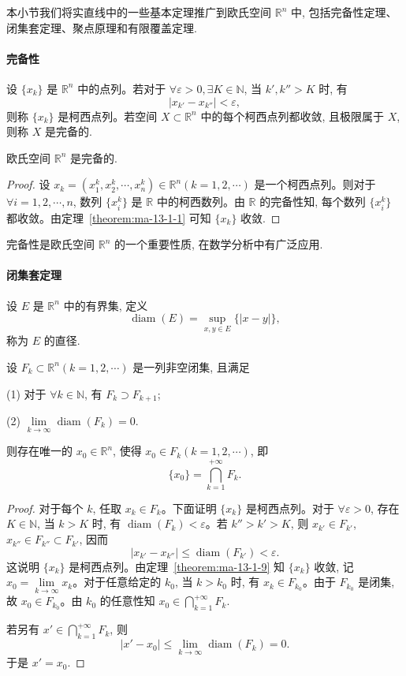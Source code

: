 本小节我们将实直线中的一些基本定理推广到欧氏空间 $\mathbb R^n$ 中, 包括完备性定理、闭集套定理、聚点原理和有限覆盖定理.

\paragraph*{完备性}


设 $\{x_k\}$ 是 $\mathbb R^n$ 中的点列。若对于 $\forall\varepsilon>0,\exists K\in\mathbb N$, 当 $k',k''>K$ 时, 有
\[
  |x_{k'}-x_{k''}|<\varepsilon,
\]
则称 $\{x_k\}$ 是柯西点列。若空间 $X\subset\mathbb R^n$ 中的每个柯西点列都收敛, 且极限属于 $X$, 则称 $X$ 是完备的.

\begin{theorem}\label{theorem:ma-13-1-9}
欧氏空间 $\mathbb R^n$ 是完备的.
\end{theorem}


\begin{proof}
设 $x_k=(x_1^k,x_2^k,\cdots,x_n^k)\in\mathbb R^n(k=1,2,\cdots)$ 是一个柯西点列。则对于 $\forall i=1,2,\cdots,n$, 数列 $\{x_i^k\}$ 是 $\mathbb R$ 中的柯西数列。由 $\mathbb R$ 的完备性知, 每个数列 $\{x_i^k\}$ 都收敛。由定理~\ref{theorem:ma-13-1-1} 可知 $\{x_k\}$ 收敛.
\end{proof}


完备性是欧氏空间 $\mathbb R^n$ 的一个重要性质, 在数学分析中有广泛应用.

\paragraph*{闭集套定理}


设 $E$ 是 $\mathbb R^n$ 中的有界集, 定义
\[
  \operatorname{diam}(E)=\sup_{x,y\in E}\{|x-y|\},
\]
称为 $E$ 的直径.

\begin{theorem}\label{theorem:ma-13-1-10}
设 $F_k\subset\mathbb R^n(k=1,2,\cdots)$ 是一列非空闭集, 且满足

(1) 对于 $\forall k\in\mathbb N$, 有 $F_k\supset F_{k+1}$;

(2) $\lim\limits_{k\to\infty}\operatorname{diam}(F_k)=0$.

则存在唯一的 $x_0\in\mathbb R^n$, 使得 $x_0\in F_k(k=1,2,\cdots)$, 即
\[
  \{x_0\}=\bigcap_{k=1}^{+\infty}F_k.
\]
\end{theorem}


\begin{proof}
对于每个 $k$, 任取 $x_k\in F_k$。下面证明 $\{x_k\}$ 是柯西点列。对于 $\forall\varepsilon>0$, 存在 $K\in\mathbb N$, 当 $k>K$ 时, 有 $\operatorname{diam}(F_k)<\varepsilon$。若 $k''>k'>K$, 则 $x_{k'}\in F_{k'}$, $x_{k''}\in F_{k''}\subset F_{k'}$, 因而
\[
  |x_{k'}-x_{k''}|\leqslant \operatorname{diam}(F_{k'})<\varepsilon.
\]
这说明 $\{x_k\}$ 是柯西点列。由定理~\ref{theorem:ma-13-1-9} 知 $\{x_k\}$ 收敛, 记 $x_0=\lim\limits_{k\to\infty}x_k$。对于任意给定的 $k_0$, 当 $k>k_0$ 时, 有 $x_k\in F_{k_0}$。由于 $F_{k_0}$ 是闭集, 故 $x_0\in F_{k_0}$。由 $k_0$ 的任意性知 $x_0\in\bigcap\limits_{k=1}^{+\infty}F_k$.

若另有 $x'\in\bigcap\limits_{k=1}^{+\infty}F_k$, 则
\[
  |x'-x_0|\leqslant \lim_{k\to\infty}\operatorname{diam}(F_k)=0.
\]
于是 $x'=x_0$.
\end{proof}


